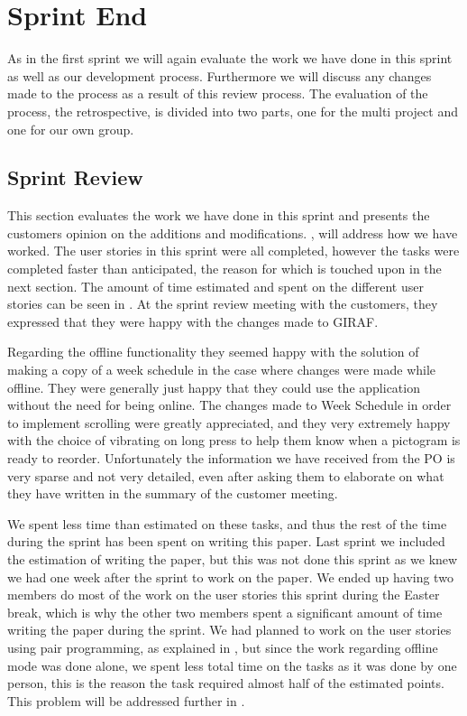 \chapter{Sprint End}
As in the first sprint we will again evaluate the work we have done in this sprint as well as our development process.
Furthermore we will discuss any changes made to the process as a result of this review process.
The evaluation of the process, the retrospective, is divided into two parts, one for the multi project and one for our own group.

\section{Sprint Review}
This section evaluates the work we have done in this sprint and presents the customers opinion on the additions and modifications.
, will address how we have worked.
The user stories in this sprint were all completed, however the tasks were completed faster than anticipated, the reason for which is touched upon in the next section.
The amount of time estimated and spent on the different user stories can be seen in .
At the sprint review meeting with the customers, they expressed that they were happy with the changes made to GIRAF.

Regarding the offline functionality they seemed happy with the solution of making a copy of a week schedule in the case where changes were made while offline.
They were generally just happy that they could use the application without the need for being online.
The changes made to Week Schedule in order to implement scrolling were greatly appreciated, and they very extremely happy with the choice of vibrating on long press to help them know when a pictogram is ready to reorder.
Unfortunately the information we have received from the PO is very sparse and not very detailed, even after asking them to elaborate on what they have written in the summary of the customer meeting.

We spent less time than estimated on these tasks, and thus the rest of the time during the sprint has been spent on writing this paper.
Last sprint we included the estimation of writing the paper, but this was not done this sprint as we knew we had one week after the sprint to work on the paper.
We ended up having two members do most of the work on the user stories this sprint during the Easter break, which is why the other two members spent a significant amount of time writing the paper during the sprint.
We had planned to work on the user stories using pair programming, as explained in , but since the work regarding offline mode was done alone, we spent less total time on the tasks as it was done by one person, this is the reason the task required almost half of the estimated points.
This problem will be addressed further in .

